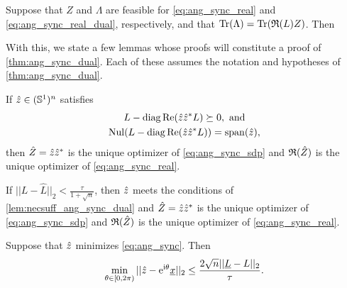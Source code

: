 \begin{corollary}
  Suppose that $Z$ and $\Lambda$ are feasible for \eqref{eq:ang_sync_real} and \eqref{eq:ang_sync_real_dual}, respectively, and that $\operatorname{Tr}(\Lambda) = \operatorname{Tr}(\mathfrak{R}(L) Z)$.  Then
\end{corollary}

With this, we state a few lemmas whose proofs will constitute a proof of \cref{thm:ang_sync_dual}.  Each of these assumes the notation and hypotheses of \cref{thm:ang_sync_dual}.

\begin{lemma}
  If $\hat{z} \in (\mathbb{S}^1)^n$ satisfies \begin{gather} L - \operatorname{diag}\operatorname{Re}(\hat{z} \hat{z}^* L) \succeq 0, \ \text{and} \label{eq:ang_sync_certificate} \\ \operatorname{Nul}(L - \operatorname{diag}\operatorname{Re}(\hat{z} \hat{z}^* L)) = \operatorname{span}(\hat{z}), \label{eq:ang_sync_nullspace} \end{gather} then $\hat{Z} = \hat{z} \hat{z}^*$ is the unique optimizer of \eqref{eq:ang_sync_sdp} and $\mathfrak{R}(\hat{Z})$ is the unique optimizer of \eqref{eq:ang_sync_real}.
  \label{lem:necsuff_ang_sync_dual}
\end{lemma}

\begin{lemma}
  If $||L - \hat{L}||_2 < \frac{\tau}{1 + \sqrt{n}}$, then $\hat{z}$ meets the conditions of \cref{lem:necsuff_ang_sync_dual} and $\hat{Z} = \hat{z} \hat{z}^*$ is the unique optimizer of \eqref{eq:ang_sync_sdp} and $\mathfrak{R}(\hat{Z})$ is the unique optimizer of \eqref{eq:ang_sync_real}.
  \label{lem:unique_ang_sync}
\end{lemma}

\begin{lemma}
  Suppose that $\hat{z}$ minimizes \eqref{eq:ang_sync}.  Then \[\min_{\theta \in [0, 2\pi)} || \hat{z} - \mathrm{e}^{\mathrm{i} \theta} \underline{x} ||_2 \le \dfrac{2 \sqrt{n} ||\underline{L} - L||_2}{\tau}.\]
    \label{lem:error_ang_sync}
\end{lemma}

